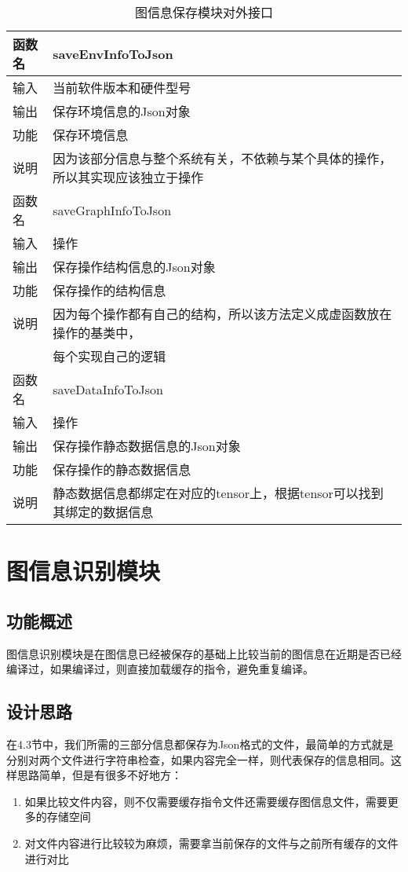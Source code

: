 \begin{table}[htb]
  \centering\footnotesize
  \caption{图信息保存模块对外接口}
  \label{tab:env-interface-tab}
  \begin{tabular}{ll}
    \toprule
    函数名       & saveEnvInfoToJson   \\
    \midrule
    输入 & 当前软件版本和硬件型号 \\
    输出 & 保存环境信息的Json对象  \\
    功能 & 保存环境信息\\
    说明 & 因为该部分信息与整个系统有关，不依赖与某个具体的操作，所以其实现应该独立于操作 \\
    \bottomrule
    \toprule
    函数名       & saveGraphInfoToJson    \\
    \midrule
    输入 & 操作 \\
    输出 & 保存操作结构信息的Json对象  \\
    功能 & 保存操作的结构信息\\
    说明 & 因为每个操作都有自己的结构，所以该方法定义成虚函数放在操作的基类中，\\
          &每个实现自己的逻辑 \\
    \bottomrule
    \toprule
    函数名       & saveDataInfoToJson    \\
    \midrule
    输入 & 操作 \\
    输出 & 保存操作静态数据信息的Json对象  \\
    功能 & 保存操作的静态数据信息\\
    说明 & 静态数据信息都绑定在对应的tensor上，根据tensor可以找到其绑定的数据信息\\
    \bottomrule
  \end{tabular}
\end{table}


\section {图信息识别模块}

\subsection {功能概述} 
图信息识别模块是在图信息已经被保存的基础上比较当前的图信息在近期是否已经编译过，如果编译过，则直接加载缓存的指令，避免重复编译。

\subsection {设计思路}
在4.3节中，我们所需的三部分信息都保存为Json格式的文件，最简单的方式就是分别对两个文件进行字符串检查，如果内容完全一样，则代表保存的信息相同。这样思路简单，但是有很多不好地方： 
\begin{enumerate}
  \item 如果比较文件内容，则不仅需要缓存指令文件还需要缓存图信息文件，需要更多的存储空间
  \item 对文件内容进行比较较为麻烦，需要拿当前保存的文件与之前所有缓存的文件进行对比
\end{enumerate}

